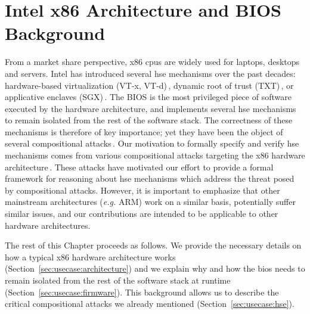 \chapter{Intel x86 Architecture and BIOS Background}
\label{chapter:usecase}


\vspace{1cm}%
\noindent
%
From a market share perspective, x86 \acp{cpu} are widely used for laptops,
desktops and servers.
%
Intel has introduced several \ac{hse} mechanisms over the past decades:
hardware-based virtualization (VT-x, VT-d)\,\cite[Volume 3, Chapter
23]{intel2014manual}, dynamic root of trust (TXT)\,\cite{intel2015txt}, or
applicative enclaves (SGX)\,\cite[Volume 3, Chapter
36]{intel2014manual}\cite{costan2016sgxexplained}.
%
The BIOS is the most privileged piece of software executed by the hardware
architecture, and implements several \ac{hse} mechanisms to remain isolated from
the rest of the software stack.
%
The correctness of these mechanisms is therefore of key importance; yet they
have been the object of several compositional
attacks\,\cite{duflot2009smram,wojtczuk2009smram,domas2015sinkhole,kallenberg2015racecondition,kovah2015senter}.
%
Our motivation to formally specify and verify \ac{hse} mechanisms comes from
various compositional attacks targeting the x86 hardware
architecture\,\cite{duflot2009smram,wojtczuk2009smram,kallenberg2015racecondition,domas2015sinkhole,kovah2015senter}.
%
These attacks have motivated our effort to provide a formal framework for
reasoning about \ac{hse} mechanisms which address the threat posed by
compositional attacks.
%
However, it is important to emphasize that other mainstream architectures
(\emph{e.g.}  ARM) work on a similar basis, potentially suffer similar issues,
and our contributions are intended to be applicable to other hardware
architectures.

The rest of this Chapter proceeds as follows.
%
We provide the necessary details on how a typical x86 hardware architecture
works (Section~\ref{sec:usecase:architecture}) and we explain why and how the
\ac{bios} needs to remain isolated from the rest of the software stack at
runtime (Section~\ref{sec:usecase:firmware}).
%
This background allows us to describe the critical compositional attacks we
already mentioned (Section~\ref{sec:usecase:hse}).

